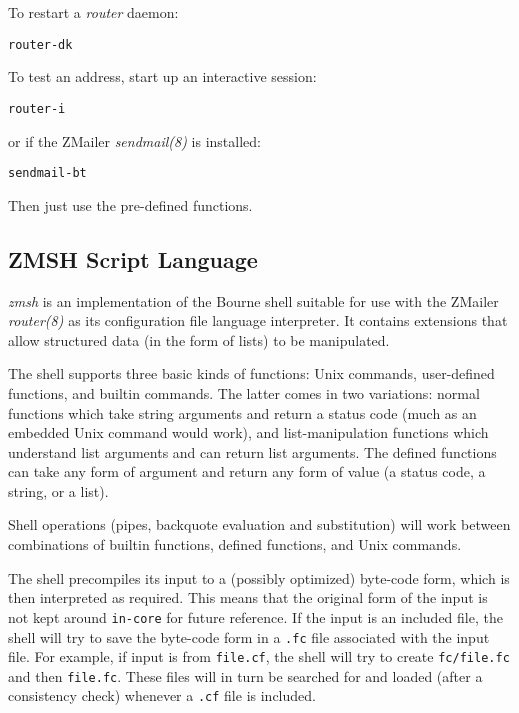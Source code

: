 To restart a {\em router} daemon: 
\begin{alltt}
   router -dk
\end{alltt}


To test an address, start up an interactive session: 
\begin{alltt}
   router -i
\end{alltt}


or if the ZMailer {\em sendmail(8)} is installed: 
\begin{alltt}
   sendmail -bt
\end{alltt}


Then just use the pre-defined functions.




\subsection{ZMSH Script Language}



{\em zmsh} is an implementation of the Bourne shell 
suitable for use with the ZMailer {\em router(8)} as 
its configuration file language interpreter. It contains 
extensions that allow structured data (in the form of lists) 
to be manipulated. 

The shell supports three basic kinds of functions: Unix 
commands, user-defined functions, and builtin commands. 
The latter comes in two variations: normal functions which 
take string arguments and return a status code (much as an 
embedded Unix command would work), and list-manipulation 
functions which understand list arguments and can return 
list arguments. The defined functions can take any form 
of argument and return any form of value (a status code, 
a string, or a list). 

Shell operations (pipes, backquote evaluation and substitution) 
will work between combinations of builtin functions, 
defined functions, and Unix commands.

The shell precompiles its input to a (possibly optimized) 
byte-code form, which is then interpreted as required. 
This means that the original form of the input is not kept 
around {\tt in-core} for future reference. If the input 
is an included file, the shell will try to save the byte-code 
form in a {\tt .fc} file associated with the input file. 
For example, if input is from {\tt file.cf}, the shell 
will try to create {\tt fc/file.fc} and then {\tt file.fc}. 
These files will in turn be searched for and loaded 
(after a consistency check) whenever a {\tt .cf} file is included. 

